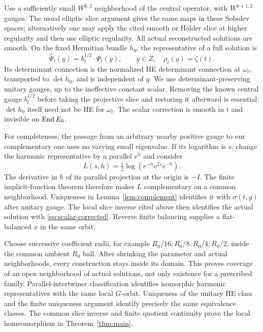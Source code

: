 Use a sufficiently small $W^{k,2}$ neighborhood of the central
operator, with $W^{k+1,2}$ gauges. The usual elliptic slice argument
gives the same maps in these Sobolev spaces; alternatively one may
apply the cited smooth or H\"older slice at higher regularity and
then use elliptic regularity. All actual reconstructed solutions
are smooth. On the fixed Hermitian bundle $h_0$, the representative
of a full solution is
\begin{equation}\label{eq:scalar-corrected}
 \widehat\Psi_t(y)=b_t^{1/2}\cdot\Psi_t(y),\qquad
       y\in Z,\quad \rho_t(y)=\zeta(t).
\end{equation}
Its determinant connection is the normalized HE determinant connection
at $\omega_t$, transported to $\det h_0$, and is independent of $y$.
We use determinant-preserving unitary gauges, up to the ineffective
constant scalar. Removing the known central gauge $b_t^{1/2}$
before taking the projective slice and restoring it afterward is
essential: $\det h_0$ itself need not be HE for $\omega_t$.
The scalar correction is smooth in $t$ and invisible on $\operatorname{End} E_0$.

For completeness, the passage from an arbitrary nearby positive
gauge to our complementary one uses no varying small eigenvalue.
If its logarithm is $s$, change the harmonic representative by a
parallel $e^h$ and consider
\begin{equation}\label{eq:positive-normalization}
 L(s,h)=\tfrac12\log(e^{-h}e^{2s}e^{-h}).
\end{equation}
The derivative in $h$ of its parallel projection at the origin is
$-I$. The finite implicit-function theorem therefore makes $L$
complementary on a common neighborhood. Uniqueness in
Lemma~\ref{lem:complement} identifies it with $\sigma(t,y)$ after
unitary gauge. The local slice inverse cited above then identifies
the actual solution with \eqref{eq:scalar-corrected}. Reverse
finite balancing supplies a flat-balanced $x$ in the same orbit.

Choose successive coefficient radii, for example
$R_0/16,R_0/8,R_0/4,R_0/2$, inside the common ambient $R_0$ ball.
After shrinking the parameter and actual neighborhoods, every
construction stays inside its domain. This proves coverage of an
open neighborhood of actual solutions, not only existence for
a prescribed family. Parallel-intertwiner classification identifies
isomorphic harmonic representatives with the same local $G$-orbit.
Uniqueness of the unitary HE class and the finite uniqueness argument
identify precisely the same equivalence classes. The common slice
inverse and finite quotient continuity prove the local homeomorphism
in Theorem~\ref{thm:main}.

